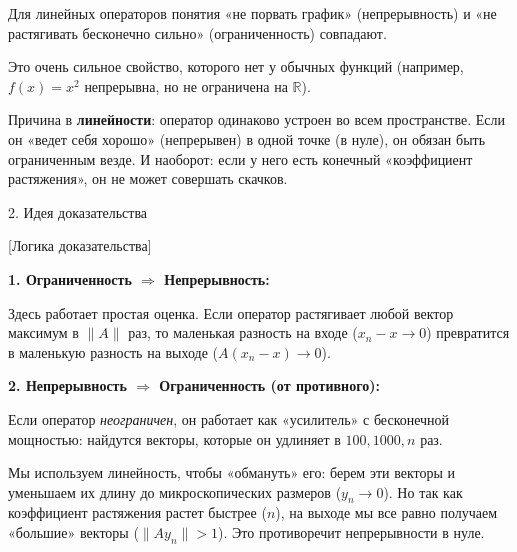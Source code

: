\begin{idea}
	
	Для линейных операторов понятия «не порвать график» (непрерывность) и «не растягивать бесконечно сильно» (ограниченность) совпадают.
	
	Это очень сильное свойство, которого нет у обычных функций (например, $f(x) = x^2$ непрерывна, но не ограничена на $\mathbb{R}$). 
	
	Причина в \textbf{линейности}: оператор одинаково устроен во всем пространстве. Если он «ведет себя хорошо» (непрерывен) в одной точке (в нуле), он обязан быть ограниченным везде. И наоборот: если у него есть конечный «коэффициент растяжения», он не может совершать скачков.
	
	
	
	2. Идея доказательства 
	
	[Логика доказательства]
	
	\textbf{1. Ограниченность $\Rightarrow$ Непрерывность:}
	
	Здесь работает простая оценка. Если оператор растягивает любой вектор максимум в $\|A\|$ раз, то маленькая разность на входе ($x_n - x \to 0$) превратится в маленькую разность на выходе ($A(x_n - x) \to 0$).
	
	\textbf{2. Непрерывность $\Rightarrow$ Ограниченность (от противного):}
	
	Если оператор \textit{неограничен}, он работает как «усилитель» с бесконечной мощностью: найдутся векторы, которые он удлиняет в $100, 1000, n$ раз.
	
	Мы используем линейность, чтобы «обмануть» его: берем эти векторы и уменьшаем их длину до микроскопических размеров ($y_n \to 0$). Но так как коэффициент растяжения растет быстрее ($n$), на выходе мы все равно получаем «большие» векторы ($\|Ay_n\| > 1$). Это противоречит непрерывности в нуле.
	
\end{idea}